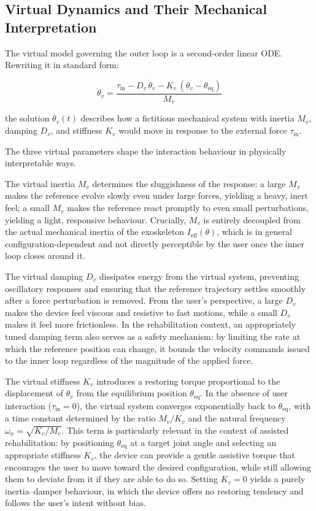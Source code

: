 \subsection{Virtual Dynamics and Their Mechanical Interpretation}
The virtual model governing the outer loop is a second-order linear ODE. Rewriting it in standard form:

\begin{equation}
    \ddot\theta_v
  = \frac{\tau_{\mathrm{in}} - D_v\,\dot\theta_v - K_v\,(\theta_v - \theta_{\mathrm{eq}})}{M_v}
\end{equation}

the solution $\theta_v(t)$ describes how a fictitious mechanical system with inertia $M_v$, damping $D_v$, and stiffness $K_v$ would move in response to the external force $\tau_{\mathrm{in}}$.
 
The three virtual parameters shape the interaction behaviour in physically interpretable ways.
 
The virtual inertia $M_v$ determines the sluggishness of the response: a large $M_v$ makes the reference evolve slowly even under large forces, yielding a heavy, inert feel; a small $M_v$ makes the reference react promptly to even small perturbations, yielding a light, responsive behaviour. Crucially, $M_v$ is entirely decoupled from the actual mechanical inertia of the exoskeleton $I_{\mathrm{eff}}(\theta)$, which is in general configuration-dependent and not directly perceptible by the user once the inner loop closes around it.
 
The virtual damping $D_v$ dissipates energy from the virtual system, preventing oscillatory responses and ensuring that the reference trajectory settles smoothly after a force perturbation is removed. From the user's perspective, a large $D_v$ makes the device feel viscous and resistive to fast motions, while a small $D_v$ makes it feel more frictionless. In the rehabilitation context, an appropriately tuned damping term also serves as a safety mechanism: by limiting the rate at which the reference position can change, it bounds the velocity commands issued to the inner loop regardless of the magnitude of the applied force.
 
The virtual stiffness $K_v$ introduces a restoring torque proportional to the displacement of $\theta_v$ from the equilibrium position $\theta_{\mathrm{eq}}$. In the absence of user interaction ($\tau_{\mathrm{in}} = 0$), the virtual system converges exponentially back to $\theta_{\mathrm{eq}}$, with a time constant determined by the ratio $M_v/K_v$ and the natural frequency $\omega_n = \sqrt{K_v/M_v}$. This term is particularly relevant in the context of assisted rehabilitation: by positioning $\theta_{\mathrm{eq}}$ at a target joint angle and selecting an appropriate stiffness $K_v$, the device can provide a gentle assistive torque that encourages the user to move toward the desired configuration, while still allowing them to deviate from it if they are able to do so. Setting $K_v = 0$ yields a purely inertia–damper behaviour, in which the device offers no restoring tendency and follows the user's intent without bias.
 

